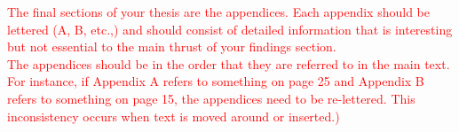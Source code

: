 \textcolor{red}{The final sections of your thesis are the appendices. Each appendix should be lettered (A, B, etc.,) and should consist of detailed information that is interesting but not essential to the main thrust of your findings section.\\
The appendices should be in the order that they are referred to in the main text. For instance, if Appendix A refers to something on page 25 and Appendix B refers to something on page 15, the appendices need to be re-lettered. This inconsistency occurs when text is moved around or inserted.)}
\label{appendixA}